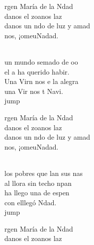 \begin{cancion}%
	\begin{chorus}%
	rgen María de la Ndad\\
	danos el zoanos laz\\
	danos un ndo de luz y amad\\
	nos, ¡omeuNadad.\\
	\end{chorus}%
	\jump\\
	 un mundo semado de oo\\
	el a ha querido habir.\\
	Una Virn nos e la alegra\\
	una Vir nos t Navi.\\jump\\
	\begin{chorus}%
	rgen María de la Ndad\\
	danos el zoanos laz\\
	danos un ndo de luz y amad\\
	nos, ¡omeuNadad.\\
	\end{chorus}%
	\jump\\
	los pobres que lan sus nas\\
	al  llora sin techo npan\\
	ha llego una  de espen\\
	con elllegó Ndad. \\jump\\
	\begin{chorus}%
	rgen María de la Ndad\\
	danos el zoanos laz\\

\end{chorus}
\end{cancion}
